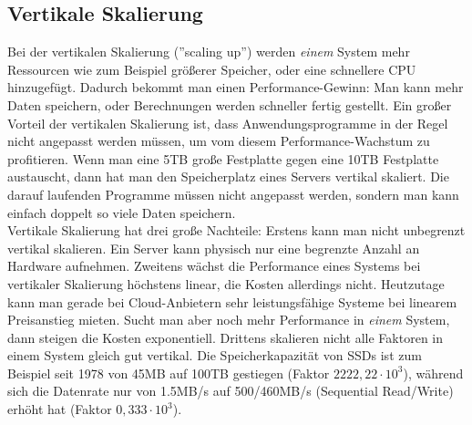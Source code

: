 \subsection{Vertikale Skalierung}
Bei der vertikalen Skalierung (''scaling up'') werden \textit{einem} System mehr Ressourcen wie zum Beispiel größerer Speicher, oder eine schnellere CPU hinzugefügt. Dadurch bekommt man einen Performance-Gewinn: Man kann mehr Daten speichern, oder Berechnungen werden schneller fertig gestellt.
Ein großer Vorteil der vertikalen Skalierung ist, dass Anwendungsprogramme in der Regel nicht angepasst werden müssen, um vom diesem Performance-Wachstum zu profitieren. Wenn man eine 5TB große Festplatte gegen eine 10TB Festplatte austauscht, dann hat man den Speicherplatz eines Servers vertikal skaliert. Die darauf laufenden Programme müssen nicht angepasst werden, sondern man kann einfach doppelt so viele Daten speichern.\cite{beaumont_how_2014}\\
Vertikale Skalierung hat drei große Nachteile: Erstens kann man nicht unbegrenzt vertikal skalieren. Ein Server kann physisch nur eine begrenzte Anzahl an Hardware aufnehmen. Zweitens wächst die Performance eines Systems bei vertikaler Skalierung höchstens linear\cite{gustafson_amdahls_2011}, die Kosten allerdings nicht\cite{noauthor_horizontal_nodate}. Heutzutage kann man gerade bei Cloud-Anbietern sehr leistungsfähige Systeme bei linearem Preisanstieg mieten.\cite{noauthor_pricing_nodate} Sucht man aber noch mehr Performance in \textit{einem} System, dann steigen die Kosten exponentiell\cite{athow_at_2020}. Drittens skalieren nicht alle Faktoren in einem System gleich gut vertikal. Die Speicherkapazität von SSDs ist zum Beispiel seit 1978 von 45MB auf 100TB gestiegen (Faktor $2222,22 \cdot 10^{3}$), während sich die Datenrate nur von 1.5MB/s auf 500/460MB/s (Sequential Read/Write) erhöht hat (Faktor $0,333 \cdot 10^{3}$).\cite{athow_at_2020}\cite{noauthor_who_nodate}  

